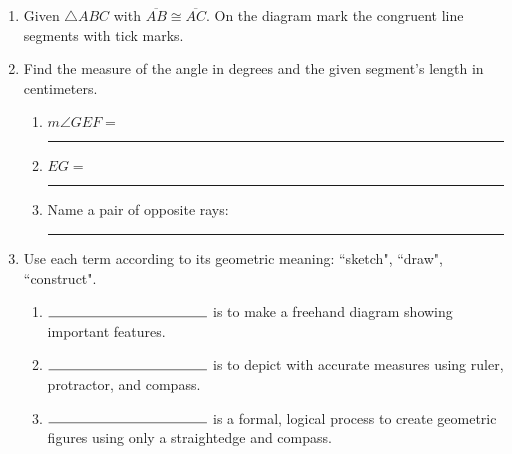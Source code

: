\documentclass[12pt, twoside]{article}
\begin{document}
\begin{enumerate}
\item Given $\triangle ABC$ with $\overline{AB} \cong \overline{AC}$. On the diagram mark the congruent line segments with tick marks.
\begin{center}
\end{center}

\item Find the measure of the angle in degrees and the given segment's length in centimeters. \vspace{0.25cm}
\begin{enumerate}
  \item  $m \angle GEF = $ \rule{4cm}{0.15mm} \bigskip
  \item  $EG=$ \rule{4cm}{0.15mm} \bigskip
  \item Name a pair of opposite rays: \rule{4cm}{0.15mm} \bigskip
\end{enumerate}
\begin{center}
\end{center}

\item Use each term according to its geometric meaning: ``sketch", ``draw", ``construct".
\begin{enumerate}
  \item $\rule{4cm}{0.15mm}$ is to make a freehand diagram showing important features. \smallskip
  \item $\rule{4cm}{0.15mm}$ is to depict with accurate measures using ruler, protractor, and compass. \smallskip
  \item $\rule{4cm}{0.15mm}$ is a formal, logical process to create geometric figures using only a straightedge and compass.
\end{enumerate} \smallskip


\end{enumerate}
\end{document}
